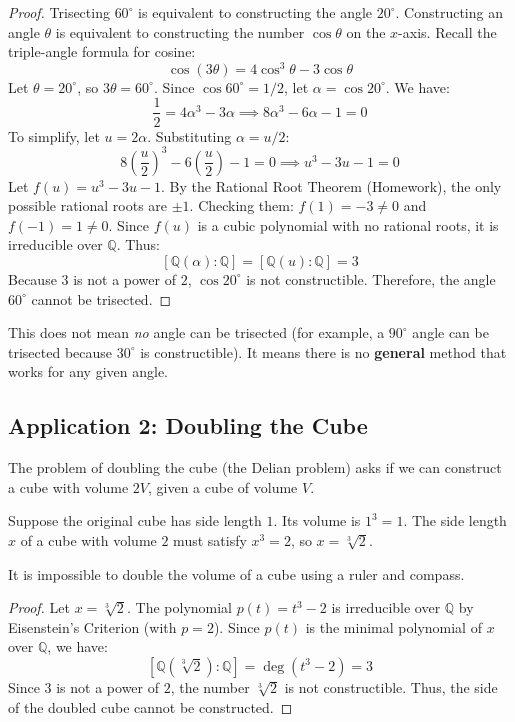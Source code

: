 \begin{proof}
Trisecting $60^\circ$ is equivalent to constructing the angle $20^\circ$. Constructing an angle $\theta$ is equivalent to constructing the number $\cos \theta$ on the $x$-axis. 
Recall the triple-angle formula for cosine:
\[ \cos(3\theta) = 4\cos^3 \theta - 3\cos \theta \]
Let $\theta = 20^\circ$, so $3\theta = 60^\circ$. Since $\cos 60^\circ = 1/2$, let $\alpha = \cos 20^\circ$. We have:
\[ \frac{1}{2} = 4\alpha^3 - 3\alpha \implies 8\alpha^3 - 6\alpha - 1 = 0 \]
To simplify, let $u = 2\alpha$. Substituting $\alpha = u/2$:
\[ 8\left(\frac{u}{2}\right)^3 - 6\left(\frac{u}{2}\right) - 1 = 0 \implies u^3 - 3u - 1 = 0 \]
Let $f(u) = u^3 - 3u - 1$. By the Rational Root Theorem (Homework), the only possible rational roots are $\pm 1$. 
Checking them: $f(1) = -3 \neq 0$ and $f(-1) = 1 \neq 0$. 
Since $f(u)$ is a cubic polynomial with no rational roots, it is irreducible over $\mathbb{Q}$.
Thus:
\[ [\mathbb{Q}(\alpha) : \mathbb{Q}] = [\mathbb{Q}(u) : \mathbb{Q}] = 3 \]
Because $3$ is not a power of $2$, $\cos 20^\circ$ is not constructible. Therefore, the angle $60^\circ$ cannot be trisected.
\end{proof}

This does not mean \textit{no} angle can be trisected (for example, a $90^\circ$ angle can be trisected because $30^\circ$ is constructible). It means there is no \textbf{general} method that works for any given angle.




\subsection{Application 2: Doubling the Cube}

The problem of doubling the cube (the Delian problem) asks if we can construct a cube with volume $2V$, given a cube of volume $V$. 

Suppose the original cube has side length $1$. Its volume is $1^3 = 1$. The side length $x$ of a cube with volume $2$ must satisfy $x^3 = 2$, so $x = \sqrt[3]{2}$.

\begin{proposition}
It is impossible to double the volume of a cube using a ruler and compass.
\end{proposition}

\begin{proof}
Let $x = \sqrt[3]{2}$. The polynomial $p(t) = t^3 - 2$ is irreducible over $\mathbb{Q}$ by Eisenstein's Criterion (with $p=2$). 
Since $p(t)$ is the minimal polynomial of $x$ over $\mathbb{Q}$, we have:
\[ [\mathbb{Q}(\sqrt[3]{2}) : \mathbb{Q}] = \deg(t^3 - 2) = 3 \]
Since $3$ is not a power of $2$, the number $\sqrt[3]{2}$ is not constructible. Thus, the side of the doubled cube cannot be constructed.
\end{proof}